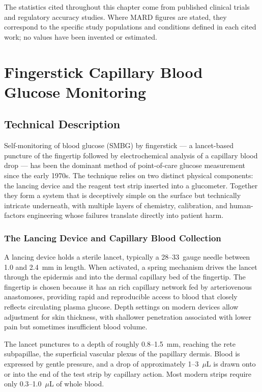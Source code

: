 The statistics cited throughout this chapter come from published clinical trials and regulatory accuracy studies. Where MARD figures are stated, they correspond to the specific study populations and conditions defined in each cited work; no values have been invented or estimated.

\chapter{Fingerstick Capillary Blood Glucose Monitoring}
\label{ch:fingerstick}

\section{Technical Description}

Self-monitoring of blood glucose (SMBG) by fingerstick --- a lancet-based puncture of the fingertip followed by electrochemical analysis of a capillary blood drop --- has been the dominant method of point-of-care glucose measurement since the early 1970s. The technique relies on two distinct physical components: the lancing device and the reagent test strip inserted into a glucometer. Together they form a system that is deceptively simple on the surface but technically intricate underneath, with multiple layers of chemistry, calibration, and human-factors engineering whose failures translate directly into patient harm.

\subsection*{The Lancing Device and Capillary Blood Collection}

A lancing device holds a sterile lancet, typically a 28--33~gauge needle between 1.0 and 2.4~mm in length. When activated, a spring mechanism drives the lancet through the epidermis and into the dermal capillary bed of the fingertip. The fingertip is chosen because it has an  rich capillary network fed by arteriovenous anastomoses, providing rapid and reproducible access to blood that closely reflects circulating plasma glucose. Depth settings on modern devices allow adjustment for skin thickness, with shallower penetration associated with lower pain but sometimes insufficient blood volume.

The lancet punctures to a depth of roughly 0.8--1.5~mm, reaching the rete subpapillae, the superficial vascular plexus of the papillary dermis. Blood is expressed by gentle pressure, and a drop of approximately 1--3~$\mu$L is drawn onto or into the end of the test strip by capillary action. Most modern strips require only 0.3--1.0~$\mu$L of whole blood.

